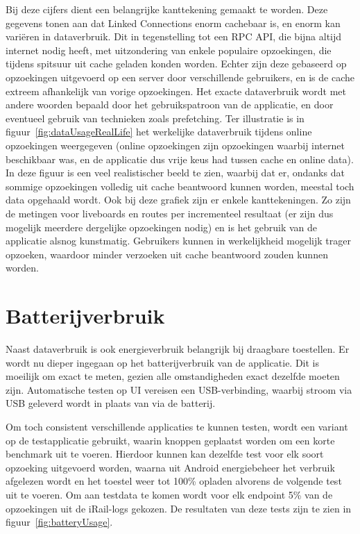 Bij deze cijfers dient een belangrijke kanttekening gemaakt te worden. Deze gegevens tonen aan dat Linked Connections enorm cachebaar is, en enorm kan variëren in dataverbruik. Dit in tegenstelling tot een RPC API, die bijna altijd internet nodig heeft, met uitzondering van enkele populaire opzoekingen, die tijdens spitsuur uit cache geladen konden worden. Echter zijn deze gebaseerd op opzoekingen uitgevoerd op een server door verschillende gebruikers, en is de cache extreem afhankelijk van vorige opzoekingen. Het exacte dataverbruik wordt met andere woorden bepaald door het gebruikspatroon van de applicatie, en door eventueel gebruik van technieken zoals prefetching. Ter illustratie is in figuur~\ref{fig:dataUsageRealLife} het werkelijke dataverbruik tijdens online opzoekingen weergegeven (online opzoekingen zijn opzoekingen waarbij internet beschikbaar was, en de applicatie dus vrije keus had tussen cache en online data). In deze figuur is een veel realistischer beeld te zien, waarbij dat er, ondanks dat sommige opzoekingen volledig uit cache beantwoord kunnen worden, meestal toch data opgehaald wordt. Ook bij deze grafiek zijn er enkele kanttekeningen. Zo zijn de metingen voor liveboards en routes per incrementeel resultaat (er zijn dus mogelijk meerdere dergelijke opzoekingen nodig) en is het gebruik van de applicatie alsnog kunstmatig. Gebruikers kunnen in werkelijkheid mogelijk trager opzoeken, waardoor minder verzoeken uit cache beantwoord zouden kunnen worden.


\section{Batterijverbruik}
Naast dataverbruik is ook energieverbruik belangrijk bij draagbare toestellen. Er wordt nu dieper ingegaan op het batterijverbruik van de applicatie. Dit is moeilijk om exact te meten, gezien alle omstandigheden exact dezelfde moeten zijn. Automatische testen op UI vereisen een USB-verbinding, waarbij stroom via USB geleverd wordt in plaats van via de batterij. 

Om toch consistent verschillende applicaties te kunnen testen, wordt een variant op de testapplicatie gebruikt, waarin knoppen geplaatst worden om een korte benchmark uit te voeren. Hierdoor kunnen kan dezelfde test voor elk soort opzoeking uitgevoerd worden, waarna uit Android energiebeheer het verbruik afgelezen wordt en het toestel weer tot 100\% opladen alvorens de volgende test uit te voeren. Om aan testdata te komen wordt voor elk endpoint 5\% van de opzoekingen uit de iRail-logs gekozen. De resultaten van deze tests zijn te zien in figuur~\ref{fig:batteryUsage}.

